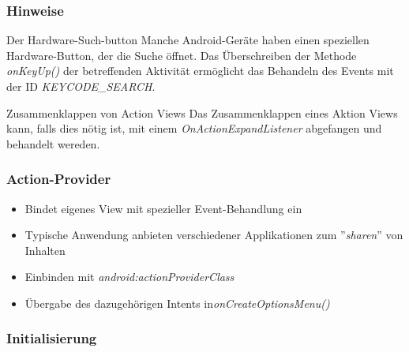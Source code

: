 \begin{frame}
   \frametitle{Hinweise}

   \begin{alertblock}{Der Hardware-Such-button}
      Manche Android-Geräte haben einen speziellen Hardware-Button, der die Suche öffnet. 
      Das Überschreiben der Methode \emph{onKeyUp()} der betreffenden Aktivität 
      ermöglicht das Behandeln des Events mit der ID \emph{KEYCODE\_SEARCH}.
   \end{alertblock}
   
   \begin{alertblock}{Zusammenklappen von Action Views}
      Das Zusammenklappen eines Aktion Views kann, falls dies nötig ist, 
      mit einem \emph{OnActionExpandListener} abgefangen und behandelt wereden.
   \end{alertblock}
\end{frame}

\begin{frame}
   \frametitle{Action-Provider}
   \begin{itemize}
      \item Bindet eigenes View mit spezieller Event-Behandlung ein
      \item Typische Anwendung anbieten verschiedener Applikationen zum ''\emph{sharen}'' 
         von Inhalten
      \item Einbinden mit \emph{android:actionProviderClass}
      \item Übergabe des dazugehörigen Intents in\emph{onCreateOptionsMenu()} 
   \end{itemize}

   
\end{frame}

\begin{frame}
   \frametitle{Initialisierung}
   
\end{frame}


